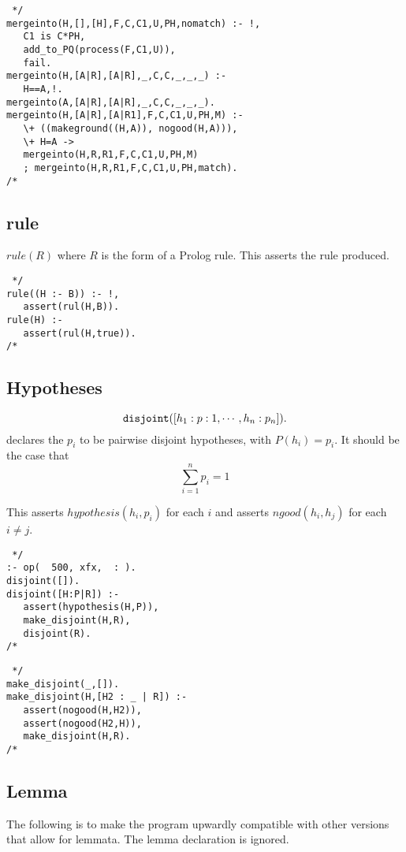\begin{verbatim} */
mergeinto(H,[],[H],F,C,C1,U,PH,nomatch) :- !,
   C1 is C*PH,
   add_to_PQ(process(F,C1,U)),
   fail.
mergeinto(H,[A|R],[A|R],_,C,C,_,_,_) :-
   H==A,!.
mergeinto(A,[A|R],[A|R],_,C,C,_,_,_).
mergeinto(H,[A|R],[A|R1],F,C,C1,U,PH,M) :-
   \+ ((makeground((H,A)), nogood(H,A))),
   \+ H=A ->
   mergeinto(H,R,R1,F,C,C1,U,PH,M)
   ; mergeinto(H,R,R1,F,C,C1,U,PH,match).
/* \end{verbatim}

\subsection{rule}

$rule(R)$ where $R$ is the form of a Prolog rule. This asserts the
rule produced.

\begin{verbatim} */
rule((H :- B)) :- !,
   assert(rul(H,B)).
rule(H) :-
   assert(rul(H,true)).
/* \end{verbatim}


\subsection{Hypotheses}

\[\hbox{\tt disjoint}([h_1:p:1,\cdots,h_n:p_n]).\]
declares the $p_i$ to be pairwise disjoint hypotheses, with $P(h_i)=p_i$.
It should be the case that 
\[\sum_{i=1}^n p_i = 1\]

This asserts $hypothesis(h_i,p_i)$ for each $i$ and asserts
$ngood(h_i,h_j)$ for each $i \neq j$.

\begin{verbatim} */
:- op(  500, xfx,  : ).
disjoint([]).
disjoint([H:P|R]) :-
   assert(hypothesis(H,P)),
   make_disjoint(H,R),
   disjoint(R).
/* \end{verbatim}
\begin{verbatim} */
make_disjoint(_,[]).
make_disjoint(H,[H2 : _ | R]) :-
   assert(nogood(H,H2)),
   assert(nogood(H2,H)),
   make_disjoint(H,R).
/* \end{verbatim}

\subsection{Lemma}

The following is to make the program upwardly compatible with other
versions that allow for lemmata. The lemma declaration is ignored.

